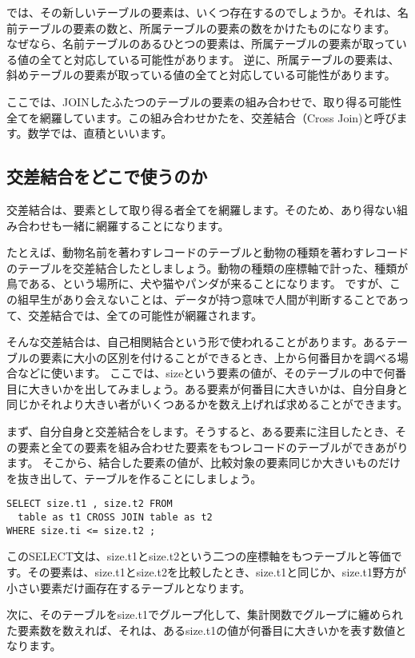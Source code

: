 では、その新しいテーブルの要素は、いくつ存在するのでしょうか。それは、名前テーブルの要素の数と、所属テーブルの要素の数をかけたものになります。
なぜなら、名前テーブルのあるひとつの要素は、所属テーブルの要素が取っている値の全てと対応している可能性があります。
逆に、所属テーブルの要素は、斜めテーブルの要素が取っている値の全てと対応している可能性があります。

ここでは、JOINしたふたつのテーブルの要素の組み合わせで、取り得る可能性全てを網羅しています。この組み合わせかたを、交差結合（Cross Join)と呼びます。数学では、直積といいます。

\subsection{交差結合をどこで使うのか}

交差結合は、要素として取り得る者全てを網羅します。そのため、あり得ない組み合わせも一緒に網羅することになります。

たとえば、動物名前を著わすレコードのテーブルと動物の種類を著わすレコードのテーブルを交差結合したとしましょう。動物の種類の座標軸で計った、種類が鳥である、という場所に、犬や猫やパンダが来ることになります。
ですが、この組早生があり会えないことは、データが持つ意味で人間が判断することであって、交差結合では、全ての可能性が網羅されます。

そんな交差結合は、自己相関結合という形で使われることがあります。あるテーブルの要素に大小の区別を付けることができるとき、上から何番目かを調べる場合などに使います。
ここでは、sizeという要素の値が、そのテーブルの中で何番目に大きいかを出してみましょう。ある要素が何番目に大きいかは、自分自身と同じかそれより大きい者がいくつあるかを数え上げれば求めることができます。

まず、自分自身と交差結合をします。そうすると、ある要素に注目したとき、その要素と全ての要素を組み合わせた要素をもつレコードのテーブルができあがります。
そこから、結合した要素の値が、比較対象の要素同じか大きいものだけを抜き出して、テーブルを作ることにしましょう。

\begin{verbatim}
SELECT size.t1 , size.t2 FROM
  table as t1 CROSS JOIN table as t2
WHERE size.ti <= size.t2 ;
\end{verbatim}

このSELECT文は、size.t1とsize.t2という二つの座標軸をもつテーブルと等価です。その要素は、size.t1とsize.t2を比較したとき、size.t1と同じか、size.t1野方が小さい要素だけ画存在するテーブルとなります。

次に、そのテーブルをsize.t1でグループ化して、集計関数でグループに纏められた要素数を数えれば、それは、あるsize.t1の値が何番目に大きいかを表す数値となります。

